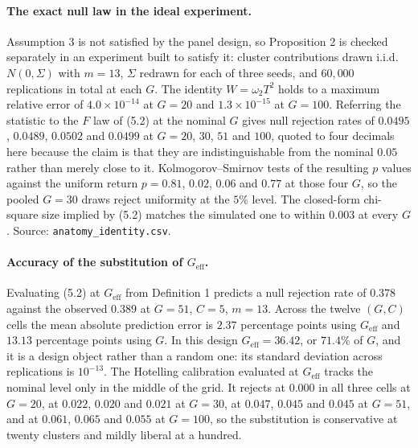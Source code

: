 \documentclass[12pt]{article}
\theoremstyle{definition}
\numberwithin{equation}{section}
\begin{document}
\paragraph{The exact null law in the ideal experiment.} Assumption 3 is
not satisfied by the panel design, so Proposition 2 is checked
separately in an experiment built to satisfy it: cluster contributions drawn
i.i.d.\ $N(0,\Sigma)$ with $m = 13$, $\Sigma$ redrawn for each of three seeds,
and $60{,}000$ replications in total at each $G$. The identity
$W = \omega_2 T^2$ holds to a maximum relative error of $4.0 \times 10^{-14}$
at $G = 20$ and $1.3 \times 10^{-15}$ at $G = 100$. Referring the statistic to
the $F$ law of (5.2) at the nominal $G$ gives null rejection rates
of $0.0495$, $0.0489$, $0.0502$ and $0.0499$ at $G = 20$, $30$, $51$ and
$100$, quoted to four decimals here because the claim is that they are
indistinguishable from the nominal $0.05$ rather than merely close to it. Kolmogorov--Smirnov tests of the resulting $p$ values against the uniform
return $p = 0.81$, $0.02$, $0.06$ and $0.77$ at those four $G$, so the pooled
$G = 30$ draws reject uniformity at the $5\%$ level. The closed-form chi-square size implied by (5.2) matches the simulated one to
within $0.003$ at every $G$. Source: \texttt{anatomy\_identity.csv}.

\paragraph{Accuracy of the substitution of $G_{\mathrm{eff}}$.} Evaluating
(5.2) at $G_{\mathrm{eff}}$ from Definition 1 predicts
a null rejection rate of $0.378$ against the observed $0.389$ at $G = 51$,
$C = 5$, $m = 13$. Across the twelve $(G,C)$ cells the mean absolute prediction
error is $2.37$ percentage points using $G_{\mathrm{eff}}$ and $13.13$
percentage points using $G$. In this design $G_{\mathrm{eff}} = 36.42$, or
$71.4\%$ of $G$, and it is a design object rather than a random one: its
standard deviation across replications is $10^{-13}$. The Hotelling
calibration evaluated at $G_{\mathrm{eff}}$ tracks the nominal level only in
the middle of the grid. It rejects at $0.000$ in all three cells at $G = 20$,
at $0.022$, $0.020$ and $0.021$ at $G = 30$, at $0.047$, $0.045$ and $0.045$ at
$G = 51$, and at $0.061$, $0.065$ and $0.055$ at $G = 100$, so the substitution
is conservative at twenty clusters and mildly liberal at a hundred.
\end{document}
